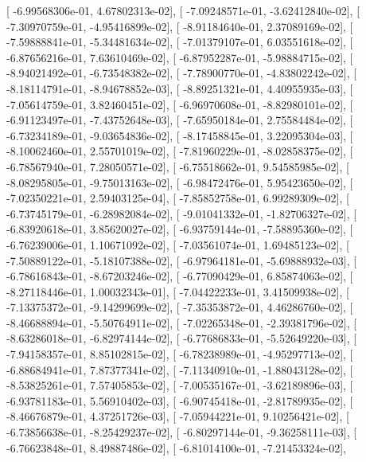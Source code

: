 \documentclass{article}
\begin{document}
       [ -6.99568306e-01,   4.67802313e-02],
       [ -7.09248571e-01,  -3.62412840e-02],
       [ -7.30970759e-01,  -4.95416899e-02],
       [ -8.91184640e-01,   2.37089169e-02],
       [ -7.59888841e-01,  -5.34481634e-02],
       [ -7.01379107e-01,   6.03551618e-02],
       [ -6.87656216e-01,   7.63610469e-02],
       [ -6.87952287e-01,  -5.98884715e-02],
       [ -8.94021492e-01,  -6.73548382e-02],
       [ -7.78900770e-01,  -4.83802242e-02],
       [ -8.18114791e-01,  -8.94678852e-03],
       [ -8.89251321e-01,   4.40955935e-03],
       [ -7.05614759e-01,   3.82460451e-02],
       [ -6.96970608e-01,  -8.82980101e-02],
       [ -6.91123497e-01,  -7.43752648e-03],
       [ -7.65950184e-01,   2.75584484e-02],
       [ -6.73234189e-01,  -9.03654836e-02],
       [ -8.17458845e-01,   3.22095304e-03],
       [ -8.10062460e-01,   2.55701019e-02],
       [ -7.81960229e-01,  -8.02858375e-02],
       [ -6.78567940e-01,   7.28050571e-02],
       [ -6.75518662e-01,   9.54585985e-02],
       [ -8.08295805e-01,  -9.75013163e-02],
       [ -6.98472476e-01,   5.95423650e-02],
       [ -7.02350221e-01,   2.59403125e-04],
       [ -7.85852758e-01,   6.99289309e-02],
       [ -6.73745179e-01,  -6.28982084e-02],
       [ -9.01041332e-01,  -1.82706327e-02],
       [ -6.83920618e-01,   3.85620027e-02],
       [ -6.93759144e-01,  -7.58895360e-02],
       [ -6.76239006e-01,   1.10671092e-02],
       [ -7.03561074e-01,   1.69485123e-02],
       [ -7.50889122e-01,  -5.18107388e-02],
       [ -6.97964181e-01,  -5.69888932e-03],
       [ -6.78616843e-01,  -8.67203246e-02],
       [ -6.77090429e-01,   6.85874063e-02],
       [ -8.27118446e-01,   1.00032343e-01],
       [ -7.04422233e-01,   3.41509938e-02],
       [ -7.13375372e-01,  -9.14299699e-02],
       [ -7.35353872e-01,   4.46286760e-02],
       [ -8.46688894e-01,  -5.50764911e-02],
       [ -7.02265348e-01,  -2.39381796e-02],
       [ -8.63286018e-01,  -6.82974144e-02],
       [ -6.77686833e-01,  -5.52649220e-03],
       [ -7.94158357e-01,   8.85102815e-02],
       [ -6.78238989e-01,  -4.95297713e-02],
       [ -6.88684941e-01,   7.87377341e-02],
       [ -7.11340910e-01,  -1.88043128e-02],
       [ -8.53825261e-01,   7.57405853e-02],
       [ -7.00535167e-01,  -3.62189896e-03],
       [ -6.93781183e-01,   5.56910402e-03],
       [ -6.90745418e-01,  -2.81789935e-02],
       [ -8.46676879e-01,   4.37251726e-03],
       [ -7.05944221e-01,   9.10256421e-02],
       [ -6.73856638e-01,  -8.25429237e-02],
       [ -6.80297144e-01,  -9.36258111e-03],
       [ -6.76623848e-01,   8.49887486e-02],
       [ -6.81014100e-01,  -7.21453324e-02],
\end{document}
